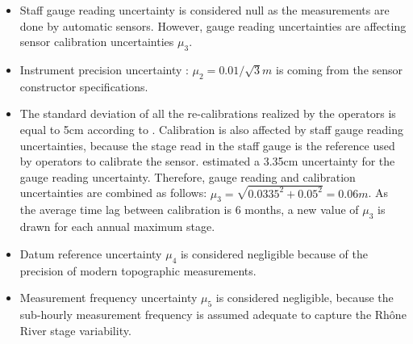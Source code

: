 \documentclass[11pt]{article}
\begin{document}
    \begin{itemize}
    
        \item Staff gauge reading uncertainty is considered null as the measurements are done by automatic sensors. However, gauge reading uncertainties are affecting sensor calibration uncertainties $\mu_3$. 
        
        \item Instrument precision uncertainty : $\mu_2 = 0.01/\sqrt{3}m$ is coming from the sensor constructor specifications.
        
        \item The standard deviation of all the re-calibrations realized by the operators is equal to 5cm according to \citet{cetiat_conference_2005}. Calibration is also affected by staff gauge reading uncertainties, because the stage read in the staff gauge is the reference used by operators to calibrate the sensor. \citet{cetiat_conference_2005} estimated a 3.35cm uncertainty for the gauge reading uncertainty. Therefore, gauge reading and calibration uncertainties are combined as follows: $\mu_3 = \sqrt{0.0335^2 + 0.05^2} = 0.06m $. As the average time lag between calibration is 6 months, a new value of $\mu_3$ is drawn for each annual maximum stage. 
        
        \item Datum reference uncertainty $\mu_4$ is considered negligible because of the precision of modern topographic measurements.
        
        \item Measurement frequency uncertainty $\mu_5$ is considered negligible, because the sub-hourly measurement frequency is assumed adequate to capture the Rhône River stage variability. 
        
    \end{itemize}
\end{document}
